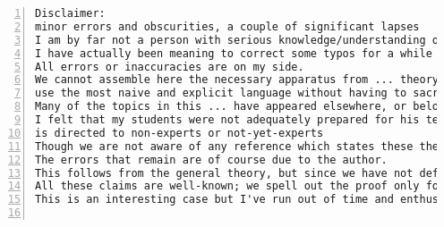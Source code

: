 \documentclass[11pt]{amsart}
\begin{document}
\begin{lstlisting}[numbers=left,numberstyle=\tiny,numbersep=10pt]
Disclaimer:
minor errors and obscurities, a couple of significant lapses
I am by far not a person with serious knowledge/understanding of ..., thus in the ... I may oversimplify/overcomplicate things, be inaccurate, or even wrong, and miss subtelties.
I have actually been meaning to correct some typos for a while and so I will hopefully do all these corrections in the next few weeks.
All errors or inaccuracies are on my side.
We cannot assemble here the necessary apparatus from ... theory.
use the most naive and explicit language without having to sacrifice any essential ideas
Many of the topics in this ... have appeared elsewhere, or belong to the mathematical folklore; it should not be assumed that uncredited results are due to the author.
I felt that my students were not adequately prepared for his text, and I wrote my notes with the hope to provide this preparation.
is directed to non-experts or not-yet-experts
Though we are not aware of any reference which states these theorems in the generality which we consider, these theorems should be considered well known.
The errors that remain are of course due to the author.
This follows from the general theory, but since we have not defined ..., we are merely stating this as a fact.
All these claims are well-known; we spell out the proof only for the reader's convenience.
This is an interesting case but I've run out of time and enthusiasm for it.


\end{lstlisting}
\end{document}
